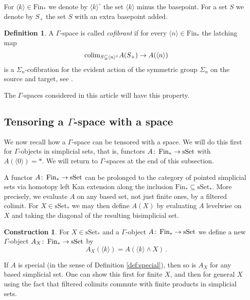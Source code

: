\documentclass[oneside, a4paper, 12pt]{article}
\numberwithin{equation}{section}
\newcommand{\Fin}{\mathrm{Fin}}
\newcommand{\sset}{\mathrm{sSet}}
\newcommand{\co}{\colon\thinspace}
\theoremstyle{plain}
\theoremstyle{definition}
\newtheorem{definition}[theorem]{Definition}
\newtheorem{construction}[theorem]{Construction}
\theoremstyle{remark}
\begin{document}
For $\langle k\rangle\in \Fin_\ast$ we denote by $\langle k\rangle^\circ$ the set $\langle k\rangle$ minus the basepoint. For a set $S$ we denote by $S_+$ the set $S$ with an extra basepoint added.

\begin{definition}
A $\Gamma$-space is called \emph{cofibrant} if for every $\langle n\rangle \in \Fin_\ast$ the latching map
\[
\textnormal{colim}_{S\subsetneq \langle n\rangle^\circ} A(S_+) \to A(\langle n\rangle)
\]
is a $\Sigma_n$-cofibration for the evident action of the symmetric group $\Sigma_n$ on the source and target, see \cite[Definition B.33]{Global}.
\end{definition}

The $\Gamma$-spaces considered in this article will have this property.

\subsection{Tensoring a $\Gamma$-space with a space} \label{sec:tensoring}


We now recall how a $\Gamma$-space can be tensored with a space. We will do this first for $\Gamma$-objects in simplicial sets, that is, functors $A\co \Fin_\ast\to \sset$ with $A(\langle 0\rangle)=\ast$. We will return to $\Gamma$-spaces at the end of this subsection.


A functor $A\co \Fin_\ast\to \sset$ can be prolonged to the category of pointed simplicial sets via homotopy left Kan extension along the inclusion $\Fin_\ast\subseteq \sset_\ast$. More precisely, we evaluate $A$ on any based set, not just finite ones, by a filtered colimit. For $X\in \sset_\ast$ we may then define $A(X)$ by evaluating $A$ levelwise on $X$ and taking the diagonal of the resulting bisimplicial set.

\begin{construction} \label{cons:tensoring}
For $X\in \sset_\ast$ and a $\Gamma$-object $A\co \Fin_\ast\to \sset$ we define a new $\Gamma$-object $A_X\co \Fin_\ast\to \sset$ by
\[
A_X(\langle k\rangle)=A(\langle k\rangle \wedge X)\,.
\]
\end{construction}

If $A$ is special (in the sense of Definition \ref{def:special}), then so is $A_X$ for any based simplicial set. One can show this first for finite $X$, and then for general $X$ using the fact that filtered colimits commute with finite products in simplicial sets.
\end{document}
